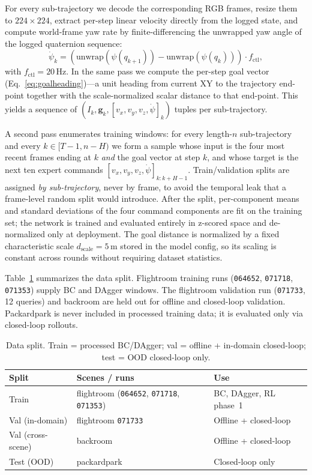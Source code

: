 \documentclass[10pt,twocolumn,letterpaper]{article}
\begin{document}
For every sub-trajectory we decode the corresponding RGB frames, resize them to $224\times224$, extract per-step linear velocity directly from the logged state, and compute world-frame yaw rate by finite-differencing the unwrapped yaw angle of the logged quaternion sequence:
\begin{equation}
\label{eq:psidot}
\dot{\psi}_k = (\mathrm{unwrap}(\psi(q_{k+1})) - \mathrm{unwrap}(\psi(q_k))) \cdot f_{\mathrm{ctl}},
\end{equation}
with $f_{\mathrm{ctl}} = 20\,\mathrm{Hz}$. In the same pass we compute the per-step goal vector (Eq.~\ref{eq:goalheading})---a unit heading from current XY to the trajectory end-point together with the scale-normalized scalar distance to that end-point. This yields a sequence of $(I_k, \mathbf{g}_k, [v_x, v_y, v_z, \dot{\psi}]_k)$ tuples per sub-trajectory.

A second pass enumerates training windows: for every length-$n$ sub-trajectory and every $k \in [T{-}1, n{-}H)$ we form a sample whose input is the four most recent frames ending at $k$ \emph{and} the goal vector at step $k$, and whose target is the next ten expert commands $[v_x, v_y, v_z, \dot{\psi}]_{k:k+H-1}$. Train/validation splits are assigned \emph{by sub-trajectory}, never by frame, to avoid the temporal leak that a frame-level random split would introduce. After the split, per-component means and standard deviations of the four command components are fit on the training set; the network is trained and evaluated entirely in z-scored space and de-normalized only at deployment. The goal distance is normalized by a fixed characteristic scale $d_{\mathrm{scale}}{=}5\,\mathrm{m}$ stored in the model config, so its scaling is constant across rounds without requiring dataset statistics.

Table~\ref{tab:dataset} summarizes the data split. Flightroom training runs (\texttt{064652}, \texttt{071718}, \texttt{071353}) supply BC and DAgger windows. The flightroom validation run (\texttt{071733}, 12 queries) and backroom are held out for offline and closed-loop validation. Packardpark is never included in processed training data; it is evaluated only via closed-loop rollouts.

\begin{table}[t]
\centering
\caption{Data split. Train = processed BC/DAgger; val = offline + in-domain closed-loop; test = OOD closed-loop only.}
\label{tab:dataset}
\small
\begin{tabular}{@{}lll@{}}
\toprule
\textbf{Split} & \textbf{Scenes / runs} & \textbf{Use} \\
\midrule
Train & flightroom (\texttt{064652}, \texttt{071718}, \texttt{071353}) & BC, DAgger, RL phase~1 \\
Val (in-domain) & flightroom \texttt{071733} & Offline + closed-loop \\
Val (cross-scene) & backroom & Offline + closed-loop \\
Test (OOD) & packardpark & Closed-loop only \\
\bottomrule
\end{tabular}
\end{table}
\end{document}
